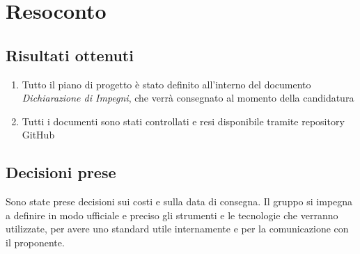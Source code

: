 \section{Resoconto}

\subsection{Risultati ottenuti}
\begin{enumerate}
    \item Tutto il piano di progetto è stato definito all'interno del documento \textit{Dichiarazione di Impegni}, che verrà consegnato al momento della candidatura
    \item Tutti i documenti sono stati controllati e resi disponibile tramite repository GitHub
\end{enumerate}

\subsection{Decisioni prese}
Sono state prese decisioni sui costi e sulla data di consegna. Il gruppo si impegna a definire in modo ufficiale e preciso gli strumenti e le tecnologie che verranno utilizzate, per avere uno standard utile internamente e per la comunicazione con il proponente.